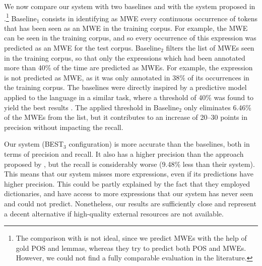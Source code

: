 \documentclass[output=paper,
modfonts
]{langscibook}
\begin{document}
We now compare our system with two baselines and with the system proposed in \citet{leroux:hal-01074298}.\footnote{The comparison with \citet{leroux:hal-01074298} is not ideal, since we predict MWEs with the help of gold POS and lemmas, whereas they try to predict both POS and MWEs. However, we could not find a fully comparable evaluation in the literature.} 
Baseline$_1$ consists in identifying as MWE every continuous occurrence of tokens that has been seen as an MWE in the training corpus. For example, the MWE  can be seen in the training corpus, and so every occurrence of this expression was predicted as an MWE for the test corpus.
Baseline$_2$ filters the list of MWEs seen in the training corpus, so that only the expressions which had been annotated more than 40\% of the time are predicted as MWEs. For example, the expression  is not predicted as MWE, as it was only annotated in $38\%$ of its occurrences in the training corpus. The baselines were directly inspired by a predictive model applied to the  language in a similar task, where a threshold of 40\% was found to yield the best results \citep{cordeiro-ramisch-villavicencio:2016:SemEval-dimsum}. The applied threshold in Baseline$_2$ only eliminates 6.46\% of the MWEs from the list, but it contributes to an increase of 20--30 points in precision without impacting the recall.


Our system (BEST$_3$ configuration) is more accurate than the baselines, both in terms of precision and recall. It also has a higher precision than the approach proposed by \citet{leroux:hal-01074298}, but the recall is considerably worse (9.48\% less than their system). This means that our system misses more expressions, even if its predictions have higher precision. This could be partly explained by the fact that they employed dictionaries, and have access to more expressions that our system has never seen and could not predict. 
Nonetheless, our results are sufficiently close and represent a decent alternative if high-quality external resources are not available.
\end{document}
